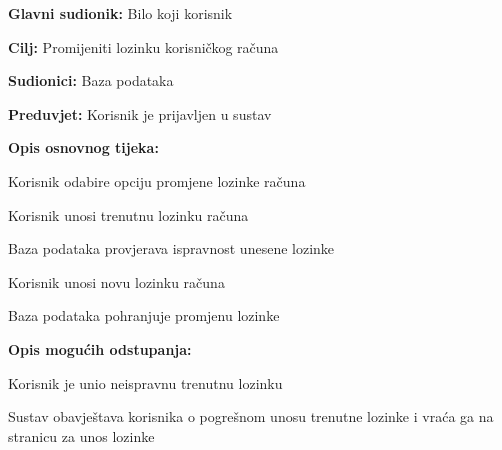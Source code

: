 					\noindent {}
					\begin{packed_item}
	
						\item \textbf{Glavni sudionik:} Bilo koji korisnik
						\item  \textbf{Cilj:} Promijeniti lozinku korisničkog računa
						\item  \textbf{Sudionici:} Baza podataka
						\item  \textbf{Preduvjet:} Korisnik je prijavljen u sustav
						\item  \textbf{Opis osnovnog tijeka:}
						
						\item[] \begin{packed_enum}
	
							\item Korisnik odabire opciju promjene lozinke računa
							\item Korisnik unosi trenutnu lozinku računa
							\item Baza podataka provjerava ispravnost unesene lozinke
							\item Korisnik unosi novu lozinku računa
							\item Baza podataka pohranjuje promjenu lozinke

						\end{packed_enum}
						
						\item  \textbf{Opis mogućih odstupanja:}
						
						\item[] \begin{packed_item}
	
							\item[3.a] Korisnik je unio neispravnu trenutnu	lozinku
							\item[] \begin{packed_enum}
								
								\item Sustav obavještava korisnika o pogrešnom unosu trenutne lozinke i vraća ga na stranicu za unos lozinke
								
							\end{packed_enum}
							
						\end{packed_item}

					\end{packed_item}


